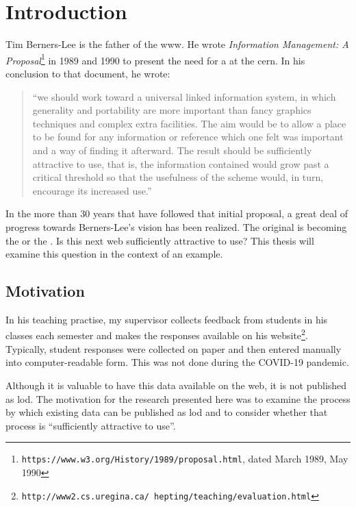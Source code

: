 
\chapter{Introduction}
\label{chap:intro}
\begin{doublespace}

Tim Berners-Lee is 
the father of the \ac{www}.
He wrote
\emph{Information Management: A Proposal}\footnote{{\tt https://www.w3.org/History/1989/proposal.html}, dated March 1989, May 1990} in 1989 and 1990
to present the need for a  at the \ac{cern}.
In his conclusion to that document, he wrote:
\blockquote{\enquote{we should work toward a universal linked information system, 
in which generality and portability are more important than fancy graphics techniques and complex extra facilities. 
The aim would be to allow a place to be found for any information or reference which one felt was important and a way of finding it afterward. 
The result should be sufficiently attractive to use, 
that is, 
the information contained would grow past a critical threshold 
so that the usefulness of the scheme would, 
in turn, 
encourage its increased use.}}

In the more than 30 years that have followed that initial proposal,
a great deal of progress towards Berners-Lee's vision has been realized.
The original  is becoming the  or the
. 
Is this next web sufficiently attractive to use?
This thesis will examine this question in the context of an example.

\section{Motivation}

In his teaching practise, 
my supervisor collects feedback from students in his classes each semester 
and makes the responses available on his 
website\footnote{\tt http://www2.cs.uregina.ca/~hepting/teaching/evaluation.html}.
Typically, student responses were collected on paper and then entered manually into
computer-readable form.
This was not done during the {COVID}-19 pandemic.

Although it is valuable to have this data available on the web,
it is not published as \ac{lod}.
The motivation for the research presented here was to examine the
process by which existing data can be published as \ac{lod} and
to consider whether that process is ``sufficiently attractive to use''.


\end{doublespace}
